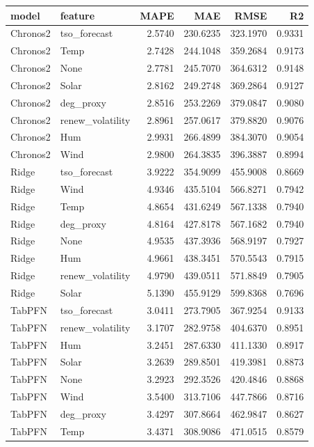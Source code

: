 \begin{tabular}{llrrrr}
\toprule
model & feature & MAPE & MAE & RMSE & R2 \\
\midrule
Chronos2 & tso_forecast & 2.5740 & 230.6235 & 323.1970 & 0.9331 \\
Chronos2 & Temp & 2.7428 & 244.1048 & 359.2684 & 0.9173 \\
Chronos2 & None & 2.7781 & 245.7070 & 364.6312 & 0.9148 \\
Chronos2 & Solar & 2.8162 & 249.2748 & 369.2864 & 0.9127 \\
Chronos2 & deg_proxy & 2.8516 & 253.2269 & 379.0847 & 0.9080 \\
Chronos2 & renew_volatility & 2.8961 & 257.0617 & 379.8820 & 0.9076 \\
Chronos2 & Hum & 2.9931 & 266.4899 & 384.3070 & 0.9054 \\
Chronos2 & Wind & 2.9800 & 264.3835 & 396.3887 & 0.8994 \\
Ridge & tso_forecast & 3.9222 & 354.9099 & 455.9008 & 0.8669 \\
Ridge & Wind & 4.9346 & 435.5104 & 566.8271 & 0.7942 \\
Ridge & Temp & 4.8654 & 431.6249 & 567.1338 & 0.7940 \\
Ridge & deg_proxy & 4.8164 & 427.8178 & 567.1682 & 0.7940 \\
Ridge & None & 4.9535 & 437.3936 & 568.9197 & 0.7927 \\
Ridge & Hum & 4.9661 & 438.3451 & 570.5543 & 0.7915 \\
Ridge & renew_volatility & 4.9790 & 439.0511 & 571.8849 & 0.7905 \\
Ridge & Solar & 5.1390 & 455.9129 & 599.8368 & 0.7696 \\
TabPFN & tso_forecast & 3.0411 & 273.7905 & 367.9254 & 0.9133 \\
TabPFN & renew_volatility & 3.1707 & 282.9758 & 404.6370 & 0.8951 \\
TabPFN & Hum & 3.2451 & 287.6330 & 411.1330 & 0.8917 \\
TabPFN & Solar & 3.2639 & 289.8501 & 419.3981 & 0.8873 \\
TabPFN & None & 3.2923 & 292.3526 & 420.4846 & 0.8868 \\
TabPFN & Wind & 3.5400 & 313.7106 & 447.7866 & 0.8716 \\
TabPFN & deg_proxy & 3.4297 & 307.8664 & 462.9847 & 0.8627 \\
TabPFN & Temp & 3.4371 & 308.9086 & 471.0515 & 0.8579 \\
\bottomrule
\end{tabular}

